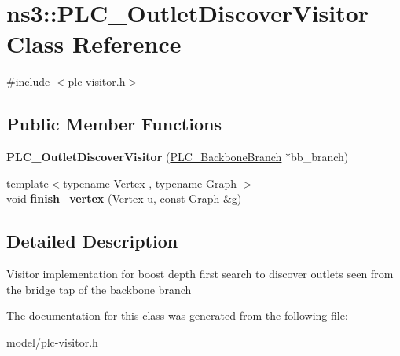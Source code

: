 \hypertarget{classns3_1_1PLC__OutletDiscoverVisitor}{\section{ns3\-:\-:\-P\-L\-C\-\_\-\-Outlet\-Discover\-Visitor \-Class \-Reference}
\label{classns3_1_1PLC__OutletDiscoverVisitor}
}


{\ttfamily \#include $<$plc-\/visitor.\-h$>$}

\subsection*{\-Public \-Member \-Functions}
\begin{DoxyCompactItemize}
\item 
\hypertarget{classns3_1_1PLC__OutletDiscoverVisitor_a30753d6d80e5e7672018e0bbef7cfceb}{{\bfseries \-P\-L\-C\-\_\-\-Outlet\-Discover\-Visitor} (\hyperlink{classns3_1_1PLC__BackboneBranch}{\-P\-L\-C\-\_\-\-Backbone\-Branch} $\ast$bb\-\_\-branch)}\label{classns3_1_1PLC__OutletDiscoverVisitor_a30753d6d80e5e7672018e0bbef7cfceb}

\item 
\hypertarget{classns3_1_1PLC__OutletDiscoverVisitor_a96641182228ce918073789700bafd5ff}{{\footnotesize template$<$typename Vertex , typename Graph $>$ }\\void {\bfseries finish\-\_\-vertex} (\-Vertex u, const \-Graph \&g)}\label{classns3_1_1PLC__OutletDiscoverVisitor_a96641182228ce918073789700bafd5ff}

\end{DoxyCompactItemize}


\subsection{\-Detailed \-Description}
\-Visitor implementation for boost depth first search to discover outlets seen from the bridge tap of the backbone branch 

\-The documentation for this class was generated from the following file\-:\begin{DoxyCompactItemize}
\item 
model/plc-\/visitor.\-h\end{DoxyCompactItemize}
